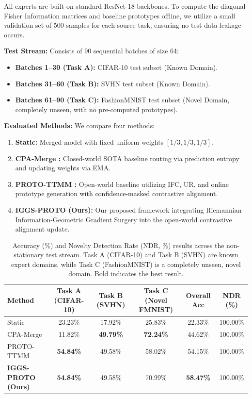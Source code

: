 \documentclass{article}
\theoremstyle{plain}
\theoremstyle{definition}
\theoremstyle{remark}
\begin{document}
All experts are built on standard ResNet-18 backbones. To compute the diagonal Fisher Information matrices and baseline prototypes offline, we utilize a small validation set of 500 samples for each source task, ensuring no test data leakage occurs.

\textbf{Test Stream:} Consists of 90 sequential batches of size 64:
\begin{itemize}
    \item \textbf{Batches 1--30 (Task A):} CIFAR-10 test subset (Known Domain).
    \item \textbf{Batches 31--60 (Task B):} SVHN test subset (Known Domain).
    \item \textbf{Batches 61--90 (Task C):} FashionMNIST test subset (Novel Domain, completely unseen, with no pre-computed prototypes).
\end{itemize}

\textbf{Evaluated Methods:} We compare four methods:
\begin{enumerate}
    \item \textbf{Static:} Merged model with fixed uniform weights $[1/3, 1/3, 1/3]$.
    \item \textbf{CPA-Merge \cite{wang2024}:} Closed-world SOTA baseline routing via prediction entropy and updating weights via EMA.
    \item \textbf{PROTO-TTMM \cite{submission8}:} Open-world baseline utilizing IFC, UR, and online prototype generation with confidence-masked contrastive alignment.
    \item \textbf{IGGS-PROTO (Ours):} Our proposed framework integrating Riemannian Information-Geometric Gradient Surgery into the open-world contrastive alignment update.
\end{enumerate}

\begin{table}[t]
\caption{Accuracy (\%) and Novelty Detection Rate (NDR, \%) results across the non-stationary test stream. Task A (CIFAR-10) and Task B (SVHN) are known expert domains, while Task C (FashionMNIST) is a completely unseen, novel domain. Bold indicates the best result.}
\label{table:main_results}
\vskip 0.15in
\begin{center}
\begin{small}
\begin{sc}
\begin{tabular}{lccccc}
\toprule
Method & Task A (CIFAR-10) & Task B (SVHN) & Task C (Novel FMNIST) & Overall Acc & NDR (\%) \\
\midrule
Static & 23.23\% & 17.92\% & 25.83\% & 22.33\% & 100.00\% \\
CPA-Merge & 11.82\% & \textbf{49.79\%} & \textbf{72.24\%} & 44.62\% & 100.00\% \\
PROTO-TTMM & \textbf{54.84\%} & 49.58\% & 58.02\% & 54.15\% & 100.00\% \\
\textbf{IGGS-PROTO (Ours)} & \textbf{54.84\%} & 49.58\% & 70.99\% & \textbf{58.47\%} & 100.00\% \\
\bottomrule
\end{tabular}
\end{sc}
\end{small}
\end{center}
\vskip -0.1in
\end{table}
\end{document}
